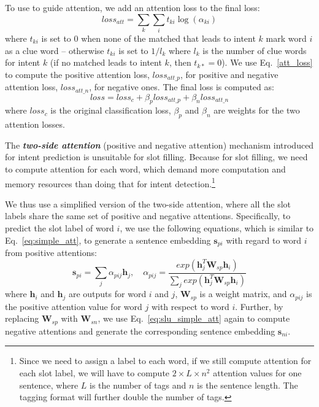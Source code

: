 To use \REs to guide attention, we add an attention loss to the final loss:
\begin{equation}
loss_{att} = \sum_{k}{\sum_{i}{t_{ki}\log(\alpha_{ki})}}
\label{att_loss}
\end{equation}
where $t_{ki}$ is set to $0$ when none of the matched \REs that leads to intent $k$ mark word $i$ as a clue word -- otherwise
$t_{ki}$ is set to $1/l_{k}$ where $l_k$ is the number of clue words
for intent $k$ (if no matched \RE leads to intent $k$, then $t_{k*}=0$).
We use Eq.~\ref{att_loss}
to compute the positive attention loss, $loss_{att\_p}$, for positive \REs and negative attention loss, $loss_{att\_n}$, for negative ones.
The final loss is computed as:
\begin{equation}
loss = loss_{c} + \beta_p loss_{att\_p} + \beta_n loss_{att\_n}
\end{equation}
where $loss_{c}$ is the original classification loss, $\beta_p$ and $\beta_n$ are weights for the two attention losses.

The \textbf{\emph{two-side attention}} (positive and negative attention) mechanism introduced for intent prediction is unsuitable for slot
filling. Because for slot filling, we need to compute attention for each word, which demand more computation
and memory resources than doing that for intent detection.\footnote{Since we need to assign a label to each word, if we still compute
attention for each slot label, we will have to compute $2\times L \times n^2$ attention values for one sentence, where $L$ is the number of
tags and $n$ is the sentence length. The \BIO tagging format will further double the number of tags.}

We thus use a simplified version of the two-side attention, where all the slot labels share the same set of positive and negative attentions.
Specifically, to predict the slot label of word $i$, we use the following equations, which is similar to Eq.~\ref{eq:simple_att}, to generate a sentence embedding $\textbf{s}_{pi}$ with regard to word $i$ from positive attentions:
\begin{equation}
\textbf{s}_{pi} = \sum_{j}{\alpha_{pij}\textbf{h}_j}, \quad \alpha_{pij}=\frac{exp(\textbf{h}_j^T\textbf{W}_{sp}\textbf{h}_i)}{\sum_{j}{exp(\textbf{h}_j^T\textbf{W}_{sp}\textbf{h}_i)}}
\label{eq:slu_simple_att}
\end{equation}
where $\textbf{h}_i$ and $\textbf{h}_j$ are \BLSTM outputs for word $i$ and $j$, $\textbf{W}_{sp}$ is a weight matrix, and $\alpha_{pij}$ is the positive attention value for word $j$ with respect to word $i$.
Further, by replacing $\textbf{W}_{sp}$ with $\textbf{W}_{sn}$, we use  Eq.~\ref{eq:slu_simple_att} again to compute negative attentions and generate the corresponding sentence embedding $\textbf{s}_{ni}$.

